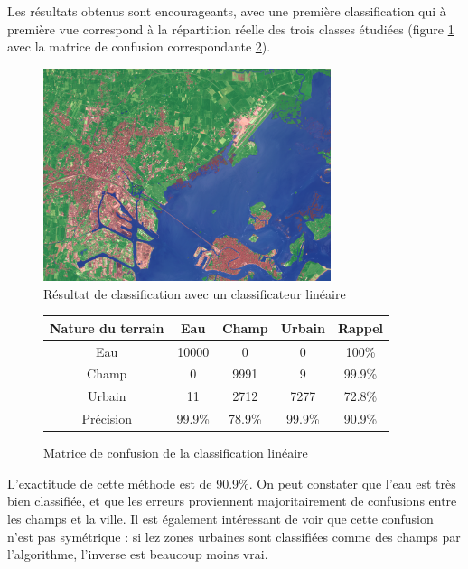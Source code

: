 \documentclass[a4paper,10pt]{article}
\begin{document}
\label{lineaire}
 Les résultats obtenus sont encourageants, avec une première classification qui à première vue correspond à la répartition réelle des trois classes étudiées (figure \ref{fig:veniseLSE} avec la matrice de confusion correspondante \ref{table:confLSE}).

\begin{figure}[H]
  \centering
    \includegraphics[width=0.75\textwidth]{veniseLSE}
  \caption{Résultat de classification avec un classificateur linéaire}
  \label{fig:veniseLSE}
\end{figure}

\begin{figure}[H]
\begin{center}
 \begin{tabular}{|c|c|c|c|c|}
  \hline
  Nature du terrain & Eau & Champ & Urbain & Rappel \\
  \hline
Eau & 10000   &   0    &   0 & 100\% \\
Champ & 0   &  9991     &   9  & 99.9\% \\
Urbain &  11   &     2712  &   7277 & 72.8\% \\
Précision & 99.9\%  & 78.9\% & 99.9\% & {\color{red}90.9\%} \\
  \hline
\end{tabular}
\end{center}
\caption{Matrice de confusion de la classification linéaire}
\label{table:confLSE}
\end{figure}

L'exactitude de cette méthode est de 90.9\%. On peut constater que l'eau est très bien classifiée, et que les erreurs proviennent majoritairement de confusions entre les champs et la ville. Il est également intéressant de voir que cette confusion n'est pas symétrique : si lez zones urbaines sont classifiées comme des champs par l'algorithme, l'inverse est beaucoup moins vrai.
\end{document}
